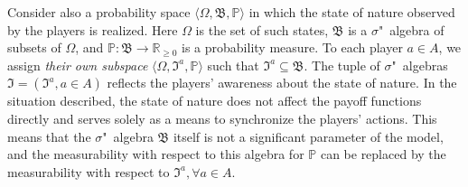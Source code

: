 Consider also a probability space \cite{Kolmogorov} $\langle \Omega, \mathfrak{B}, \mathbb{P} \rangle$ in which the state of nature observed by the players is realized. Here $\Omega$ is the set of such states, $\mathfrak{B}$ is a $\sigma$"~algebra of subsets of $\Omega$, and $\mathbb{P} : \mathfrak{B} \rightarrow \mathbb{R}_{\ge 0}$ is a probability measure. To each player $a \in A$, we assign \emph{their own subspace} $\langle \Omega, \mathfrak{I}^a, \mathbb{P} \rangle$ such that $\mathfrak{I}^a \subseteq \mathfrak{B}$. The tuple of $\sigma$"~algebras $\mathfrak{I} = (\mathfrak{I}^a, a \in A)$ reflects the players’ awareness about the state of nature. In the situation described, the state of nature does not affect the payoff functions directly and serves solely as a means to synchronize the players’ actions. This means that the $\sigma$"~algebra $\mathfrak{B}$ itself is not a significant parameter of the model, and the measurability with respect to this algebra for $\mathbb{P}$ can be replaced by the measurability with respect to $\mathfrak{I}^a, \forall a \in A$. %

